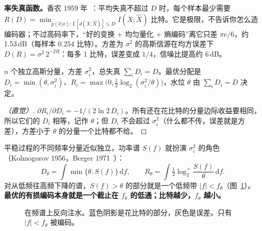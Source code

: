 \textbf{率失真函数。}香农 1959 年~\cite{shannon1959}：平均失真不超过 $D$ 时，每个样本最少需要
$R(D)=\min_{p(\hat x|x):\,\mathbb E[d(X,\hat X)]\le D}I(X;\hat X)$ 比特。它是极限，不告诉你怎么造编码器；不过高码率下，“好的变换 + 均匀量化 + 熵编码”离它只差 $\pi e/6$，约 1.53\,dB（每样本 0.254 比特）。方差为 $\sigma^2$ 的高斯信源在均方误差下 $D(R)=\sigma^2\,2^{-2R}$：每多 1 比特，误差变成 $1/4$，信噪比提高约 6\,dB。

\begin{theorem}
$n$ 个独立高斯分量，方差 $\sigma_i^2$，总失真 $\sum_iD_i=D$。最优分配是 $D_i=\min(\theta,\sigma_i^2)$、$R_i=\max\big(0,\tfrac12\log_2(\sigma_i^2/\theta)\big)$，水位 $\theta$ 由 $\sum_iD_i=D$ 决定。
\end{theorem}
\begin{proof}[（直觉）]
$\partial R_i/\partial D_i=-1/(2\ln2\,D_i)$。所有还在花比特的分量边际收益要相同，所以它们的 $D_i$ 相等，记作 $\theta$；但 $D_i$ 不会超过 $\sigma_i^2$（什么都不传，误差就是方差），方差小于 $\theta$ 的分量一个比特都不给。
\end{proof}
平稳过程的不同频率分量近似独立，功率谱 $S(f)$ 就扮演 $\sigma_i^2$ 的角色（Kolmogorov 1956，Berger 1971~\cite{berger1971}）：
\[
D_\theta=\int\min\{\theta,S(f)\}\,\mathrm df,\qquad R_\theta=\int\tfrac12\log_2^{+}\frac{S(f)}{\theta}\,\mathrm df.
\]
对从低频往高频下降的谱，$S(f)>\theta$ 的部分就是一个低频带 $|f|<f_\theta$（图~\ref{fig:rwf}）。\textbf{最优的有损编码本身就是一个截止在 $f_\theta$ 的低通；比特越少，$f_\theta$ 越小。}

\begin{figure}[htbp]
\centering
{}
\caption{在频谱上反向注水。蓝色阴影是花比特的部分，灰色是误差。只有 $|f|<f_\theta$ 被编码。}\label{fig:rwf}
\end{figure}

